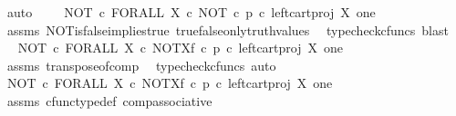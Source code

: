 \begin{isabellebody}
\ auto\isanewline
\ \isamarkupfalse%
\ \isamarkupfalse%
\ {\isachardoublequoteopen}NOT\ {\isasymcirc}\isactrlsub c\ FORALL\ X\ {\isasymcirc}\isactrlsub c\ {\isacharparenleft}{\kern0pt}NOT\ {\isasymcirc}\isactrlsub c\ p\ {\isasymcirc}\isactrlsub c\ left{\isacharunderscore}{\kern0pt}cart{\isacharunderscore}{\kern0pt}proj\ X\ one{\isacharparenright}{\kern0pt}\isactrlsup {\isasymsharp}\ {\isacharequal}{\kern0pt}\ {\isasymt}{\isachardoublequoteclose}\isanewline
\ \ \ \isamarkupfalse%
\ assms\ NOT{\isacharunderscore}{\kern0pt}is{\isacharunderscore}{\kern0pt}false{\isacharunderscore}{\kern0pt}implies{\isacharunderscore}{\kern0pt}true\ true{\isacharunderscore}{\kern0pt}false{\isacharunderscore}{\kern0pt}only{\isacharunderscore}{\kern0pt}truth{\isacharunderscore}{\kern0pt}values\ \isamarkupfalse%
\ {\isacharparenleft}{\kern0pt}typecheck{\isacharunderscore}{\kern0pt}cfuncs{\isacharcomma}{\kern0pt}\ blast{\isacharparenright}{\kern0pt}\isanewline
\ \isamarkupfalse%
\ \isamarkupfalse%
\ {\isachardoublequoteopen}NOT\ {\isasymcirc}\isactrlsub c\ FORALL\ X\ {\isasymcirc}\isactrlsub c\ NOT\isactrlbsup X\isactrlesup \isactrlsub f\ {\isasymcirc}\isactrlsub c\ {\isacharparenleft}{\kern0pt}p\ {\isasymcirc}\isactrlsub c\ left{\isacharunderscore}{\kern0pt}cart{\isacharunderscore}{\kern0pt}proj\ X\ one{\isacharparenright}{\kern0pt}\isactrlsup {\isasymsharp}\ {\isacharequal}{\kern0pt}\ {\isasymt}{\isachardoublequoteclose}\isanewline
\ \ \ \isamarkupfalse%
\ assms\ transpose{\isacharunderscore}{\kern0pt}of{\isacharunderscore}{\kern0pt}comp\ \isamarkupfalse%
\ {\isacharparenleft}{\kern0pt}typecheck{\isacharunderscore}{\kern0pt}cfuncs{\isacharcomma}{\kern0pt}\ auto{\isacharparenright}{\kern0pt}\isanewline
\ \isamarkupfalse%
\ \isamarkupfalse%
\ {\isachardoublequoteopen}{\isacharparenleft}{\kern0pt}NOT\ {\isasymcirc}\isactrlsub c\ FORALL\ X\ {\isasymcirc}\isactrlsub c\ NOT\isactrlbsup X\isactrlesup \isactrlsub f{\isacharparenright}{\kern0pt}\ {\isasymcirc}\isactrlsub c\ {\isacharparenleft}{\kern0pt}p\ {\isasymcirc}\isactrlsub c\ left{\isacharunderscore}{\kern0pt}cart{\isacharunderscore}{\kern0pt}proj\ X\ one{\isacharparenright}{\kern0pt}\isactrlsup {\isasymsharp}\ {\isacharequal}{\kern0pt}\ {\isasymt}{\isachardoublequoteclose}\isanewline
\ \ \ \ \isamarkupfalse%
\ assms\ cfunc{\isacharunderscore}{\kern0pt}type{\isacharunderscore}{\kern0pt}def\ comp{\isacharunderscore}{\kern0pt}associative\ \isamarkupfalse%

\end{isabellebody}
